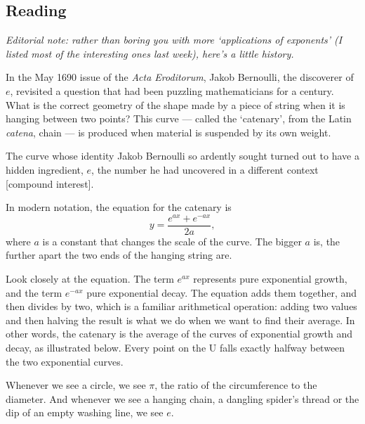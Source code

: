 



\subsection*{Reading}
\emph{Editorial note: rather than boring you with more `applications of exponents' (I listed most of the interesting
ones last week), here's a little history.}

In the May 1690 issue of the \textit{Acta Eroditorum}, Jakob Bernoulli, the discoverer of $ e $, revisited a question that had
been puzzling mathematicians for a century. What is the correct geometry of the shape made by a piece of string when it is hanging
between two points? This curve --- called the `catenary', from the Latin \textit{catena}, chain --- is produced when material is
suspended by its own weight.

The curve whose identity Jakob Bernoulli so ardently sought turned out to have a hidden ingredient, $ e $, the number he had
uncovered in a different context [compound interest].

In modern notation, the equation for the catenary is
\begin{displaymath}
  y = \frac{e^{ax} + e^{-ax}}{2a},
\end{displaymath}
where $ a $ is a constant that changes the scale of the curve. The bigger $ a $ is, the further apart the two ends of the hanging
string are.

Look closely at the equation. The term $ e^{ax} $ represents pure exponential growth, and the term $ e^{-ax} $ pure exponential
decay. The equation adds them together, and then divides by two, which is a familiar arithmetical operation: adding two values
and then halving the result is what we do when we want to find their average. In other words, the catenary is the average
of the curves of exponential growth and decay, as illustrated below. Every point on the U falls exactly halfway between the
two exponential curves.

Whenever we see a circle, we see $ \pi $, the ratio of the circumference to the diameter. And whenever we see a hanging chain,
a dangling spider's thread or the dip of an empty washing line, we see $ e $.

\begin{center}
\end{center}

